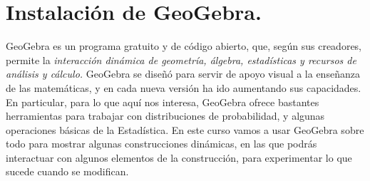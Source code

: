 \documentclass[10pt,a4paper]{article}\usepackage[]{graphicx}\usepackage[]{color}
\newcounter {cont01}
\begin{document}


\section{Instalación de GeoGebra.}
\label{tut00:sec:InstalacionGeoGebra}

GeoGebra  es un programa gratuito y de código abierto, que, según sus creadores, permite la {\em
interacción dinámica de geometría, álgebra, estadísticas y recursos de análisis y cálculo.}
GeoGebra  se diseñó para servir de apoyo visual a la enseñanza de las matemáticas, y en cada nueva
versión ha ido aumentando sus capacidades. En particular, para lo que aquí nos interesa,  GeoGebra
ofrece bastantes herramientas para trabajar con distribuciones de probabilidad, y algunas
operaciones básicas de la Estadística. En este curso vamos a usar  GeoGebra  sobre todo para
mostrar algunas construcciones dinámicas, en las que podrás interactuar con algunos elementos de la
construcción, para experimentar lo que sucede cuando se modifican.

\end{document}
